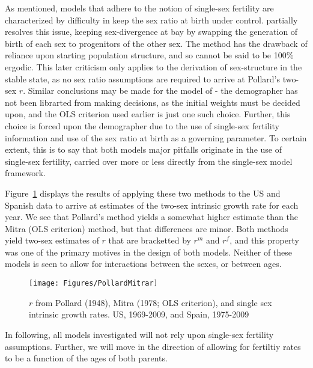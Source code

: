 
As mentioned, models that adhere to the notion of single-sex fertility are
characterized by difficulty in keep the sex ratio at birth under control.
\citet{pollard1948measurement} partially resolves this issue, keeping
sex-divergence at bay by swapping the generation of birth of each sex to
progenitors of the other sex. The method has the drawback of reliance upon
starting population structure, and so cannot be said to be 100\% ergodic. This
later criticism only applies to the derivation of sex-structure in the stable
state, as no sex ratio assumptions are required to arrive at Pollard's two-sex
$r$. Similar conclusions may be made for the model of
\citet{mitra1978derivation}- the demographer has not been librarted from making
decisions, as the initial weights must be decided upon, and the OLS criterion
used earlier is just one such choice. Further, this choice is forced upon the
demographer due to the use of single-sex fertility information and use of the
sex ratio at birth as a governing parameter. To certain extent, this is to say
that both models major pitfalls originate in the use of single-sex fertility,
carried over more or less directly from the single-sex model framework.

Figure~\ref{fig:PollardMitrar} displays the results of applying these two
methods to the US and Spanish data to arrive at estimates of the two-sex 
intrinsic growth rate for each year. We see that
Pollard's method yields a somewhat higher estimate than the Mitra (OLS
criterion) method, but that differences are minor. Both methods yield two-sex
estimates of $r$ that are bracketted by $r^m$ and $r^f$, and this property was
one of the primary motives in the design of both models. Neither of these models
is seen to allow for interactions between the sexes, or between ages.

\begin{figure}[ht!]
        \centering  
          \caption{$r$ from Pollard (1948), Mitra (1978; OLS criterion),
          and single sex intrinsic growth rates. US, 1969-2009, and Spain, 1975-2009}
           \texttt{[image: Figures/PollardMitrar]}
          \label{fig:PollardMitrar}
\end{figure}

In following, all models investigated will not rely upon single-sex fertility
assumptions. Further, we will move in the direction of allowing for fertiltiy
rates to be a function of the ages of both parents.












